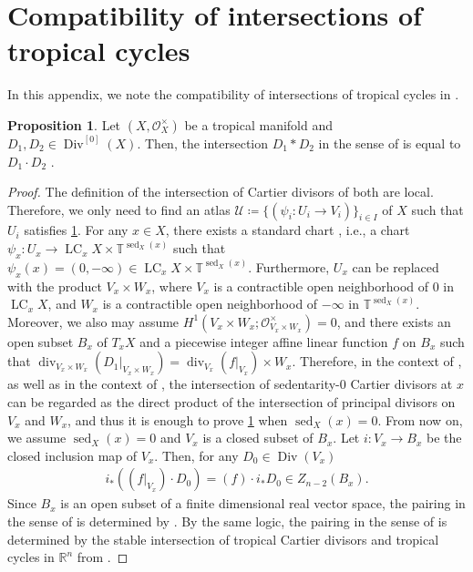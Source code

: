 \documentclass[a4paper,dvipdfmx,reqno,12pt]{amsart}
\theoremstyle{definition}
\newtheorem{proposition}[theorem]{Proposition}
\newcommand{\deq}{\coloneqq}
\newcommand{\opn}[1]{\operatorname{#1}}
\numberwithin{equation}{section}
\begin{document}
\section{Compatibility of intersections of tropical cycles}
In this appendix, we note the compatibility of
intersections of tropical cycles in
\cite{MR4637248,demedrano2023chern,shaw2015tropical}.
\begin{proposition}
\label{proposition-two-intersection}
Let $(X,\mathcal{O}_X^{\times})$ be a tropical manifold
and $D_1,D_2\in \opn{Div}^{[0]}(X)$. Then,
the intersection $D_1*D_2$ in the sense of
\cite[]{demedrano2023chern} is equal
to $D_1\cdot D_2$ \cite[]{MR4637248}.
\end{proposition}
\begin{proof}
\label{proposition-two-pairings}
The definition of
the intersection of Cartier divisors
of both are local.
Therefore, we only need to find an atlas
$\mathcal{U}\deq \{(\psi_i:U_i\to V_i)\}_{i\in I}$
of $X$
such that $U_i$ satisfies
\cref{proposition-two-intersection}.
For any $x\in X$, there exists
a standard chart \cite[Definition 7.2.10]{mikhalkin2018tropical},
i.e., a chart $ \psi_x
\colon U_x \to 
\opn{LC}_x X\times \mathbb{T}^{\opn{sed}_X(x)}$
such that $\psi_x(x)=(0,-\infty)\in
\opn{LC}_x X\times \mathbb{T}^{\opn{sed}_X(x)}$.
Furthermore, $U_x$ can be replaced with the product 
$V_x \times W_x$,
where $V_x$ is a contractible open neighborhood of $0$
in $\opn{LC}_x X$,
and $W_x$ is a contractible open neighborhood of
$-\infty$ in $\mathbb{T}^{\opn{sed}_X(x)}$.
Moreover, we also may assume 
$H^{1}(V_x\times W_x;\mathcal{O}_{V_x\times W_x}^{\times})=0$,
and there exists an open subset $B_x$ of $T_x X$ and
a piecewise integer affine linear function $f$
on $B_x$ such that 
$\opn{div}_{V_x\times W_x}(D_1|_{V_x\times W_x})=\opn{div}_{V_x}(f|_{V_x})\times W_x$.
Therefore, in the context of
\cite{MR4637248}, as well as in the context of
\cite{demedrano2023chern}, the intersection
of sedentarity-0 Cartier divisors at $x$  
can be regarded as the direct product of
the intersection of principal divisors on 
$V_x$ and $W_x$, and thus
it is enough to prove \cref{proposition-two-intersection}
when $\opn{sed}_X(x)=0$. From now on, we assume
$\opn{sed}_X(x)=0$ and $V_x$ is a closed subset of
$B_x$. Let $i \colon V_x\to B_x$ be the closed inclusion
map of $V_x$. Then, for any $D_0\in \opn{Div}(V_x)$ 
\begin{align}
i_*((f|_{V_x})\cdot D_0)=(f)\cdot i_*D_0
\in Z_{n-2}(B_x).
\end{align}
Since $B_x$ is an open subset of a finite dimensional
real vector space, the pairing in the sense of 
\cite[]{MR4637248} is
determined by \cite[Definition 3.4]{MR2591823}.
By the same logic, the pairing in the sense
of \cite[]{demedrano2023chern}
is determined by the stable intersection of
tropical Cartier divisors and tropical cycles
in $\mathbb{R}^{n}$ \cite[Definition 4.4]{MR2275625}
from \cite[Proposition 2.1.9]{shaw2011tropical}.


\end{proof}
\end{document}
